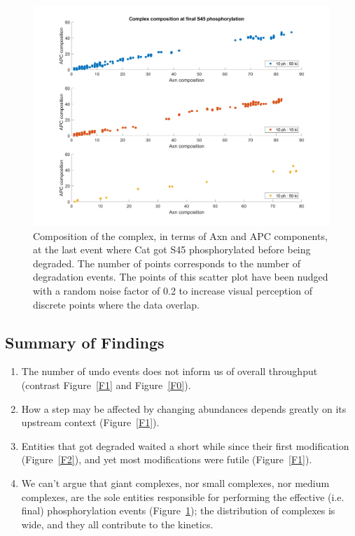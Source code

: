 \begin{figure}[h]
  \centering
  \includegraphics[width=\columnwidth]{wnt/F6_complex_composition_final_S45.png}
  \caption{Composition of the complex, in terms of Axn and APC
    components, at the last event where Cat got S45 phosphorylated
    before being degraded. The number of points corresponds to the number of
    degradation events. The points of this scatter plot have
    been nudged with a random noise factor of 0.2 to increase visual
    perception of discrete points where the data overlap.}
  \label{F6}
\end{figure}


\subsection{Summary of Findings}

\begin{enumerate}
\item The number of undo events does not inform us of overall
  throughput (contrast Figure~\ref{F1} and Figure~\ref{F0}).
\item How a step may be affected by changing abundances depends
  greatly on its upstream context (Figure~\ref{F1}).
\item Entities that got degraded waited a short while since their
  first modification (Figure~\ref{F2}), and yet most modifications
  were futile (Figure~\ref{F1}).
\item We can't argue that giant complexes, nor small complexes, nor
  medium complexes, are the sole entities responsible for performing
  the effective (i.e. final) phosphorylation events  (Figure~\ref{F6}); %
  the distribution of complexes is wide, and they all contribute to
  the kinetics.
\end{enumerate}
